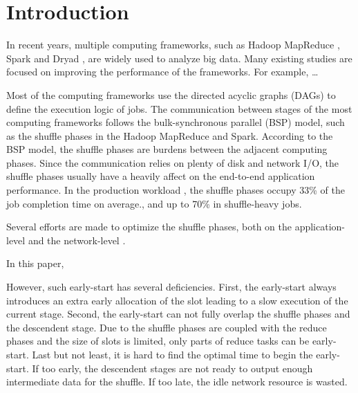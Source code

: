 \section{Introduction}
In recent years, multiple computing frameworks, such as Hadoop MapReduce \cite{}, Spark \cite{} and Dryad \cite{}, are widely used to analyze big data.
Many existing studies are focused on improving the performance of the frameworks.
For example, \dots

Most of the computing frameworks use the directed acyclic graphs (DAGs) to define the execution logic of jobs.
The communication between stages of the most computing frameworks follows the bulk-synchronous parallel (BSP) model, such as the shuffle phases in the Hadoop MapReduce and Spark.
According to the BSP model, the shuffle phases are burdens between the adjacent computing phases.
Since the communication relies on plenty of disk and network I/O, the shuffle phases usually have a heavily affect on the end-to-end application performance.
In the production workload \cite{}, the shuffle phases occupy 33\% of the job completion time on average., and up to 70\% in shuffle-heavy jobs. 

Several efforts are made to optimize the shuffle phases, both on the application-level \cite{} and the network-level \cite{}.

In this paper, 

However, such early-start has several deficiencies.
First, the early-start always introduces an extra early allocation of the slot leading to a slow execution of the current stage.
Second, the early-start can not fully overlap the shuffle phases and the descendent stage. Due to the shuffle phases are coupled with the reduce phases and the size of slots is limited, only parts of reduce tasks can be early-start. 
Last but not least, it is hard to find the optimal time to begin the early-start. If too early, the descendent stages are not ready to output enough intermediate data for the shuffle. If too late, the idle network resource is wasted.